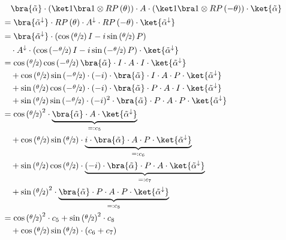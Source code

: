 \begin{equation}
    \label{eq:single-prob-simplification3}
    \begin{split}
            &\quad \bra{\tilde\alpha} \cdot (\ket 1 \bra 1 \otimes RP\left(\theta\right)) \cdot A \cdot (\ket 1 \bra 1 \otimes RP\left(-\theta\right)) \cdot \ket{\tilde\alpha} \\
            &= \bra{\tilde\alpha^\downarrow} \cdot RP\left(\theta\right) \cdot A^\downarrow \cdot RP\left(-\theta\right) \cdot \ket{\tilde\alpha^\downarrow} \\
            &= \bra{\tilde\alpha^\downarrow} \cdot \left(\cos\left(\sfrac\theta2\right) I - i \sin\left(\sfrac\theta2\right) P\right) \\
                &\quad\cdot A^\downarrow \cdot \left(\cos\left(-\sfrac\theta2\right) I - i \sin\left(-\sfrac\theta2\right) P\right) \cdot \ket{\tilde\alpha^\downarrow} \\
            &= \cos\left(\sfrac\theta2\right)\cos\left(-\sfrac\theta2\right) \bra{\tilde\alpha} \cdot I \cdot A \cdot I \cdot \ket{\tilde\alpha^\downarrow} \\
                &\quad + \cos\left(\sfrac\theta2\right)\sin\left(-\sfrac\theta2\right) \cdot (-i) \cdot \bra{\tilde\alpha} \cdot I \cdot A \cdot P \cdot \ket{\tilde\alpha^\downarrow}  \\
                &\quad + \sin\left(\sfrac\theta2\right)\cos\left(-\sfrac\theta2\right) \cdot (-i) \cdot \bra{\tilde\alpha} \cdot P \cdot A \cdot I \cdot \ket{\tilde\alpha^\downarrow} \\
                &\quad + \sin\left(\sfrac\theta2\right)\sin\left(-\sfrac\theta2\right) \cdot (-i)^2 \cdot \bra{\tilde\alpha} \cdot P \cdot A \cdot P \cdot \ket{\tilde\alpha^\downarrow} \\
            &= \cos\left(\sfrac\theta2\right)^2 \cdot \underbrace{\bra{\tilde\alpha} \cdot A \cdot \ket{\tilde\alpha^\downarrow}}_{=: c_5} \\
                &\quad + \cos\left(\sfrac\theta2\right)\sin\left(\sfrac\theta2\right) \cdot \underbrace{i \cdot \bra{\tilde\alpha} \cdot A \cdot P \cdot \ket{\tilde\alpha^\downarrow}}_{=: c_6} \\
                &\quad + \sin\left(\sfrac\theta2\right)\cos\left(\sfrac\theta2\right) \cdot \underbrace{(-i) \cdot \bra{\tilde\alpha} \cdot P \cdot A \cdot \ket{\tilde\alpha^\downarrow}}_{=: c_7} \\
                &\quad + \sin\left(\sfrac\theta2\right)^2 \cdot \underbrace{\bra{\tilde\alpha} \cdot P \cdot A \cdot P \cdot \ket{\tilde\alpha^\downarrow}}_{=: c_8} \\
            &= \cos\left(\sfrac\theta2\right)^2 \cdot c_5 + \sin\left(\sfrac\theta2\right)^2 \cdot c_8 \\
                &\quad + \cos\left(\sfrac\theta2\right)\sin\left(\sfrac\theta2\right) \cdot \left(c_6 + c_7\right)
    \end{split}
\end{equation}

